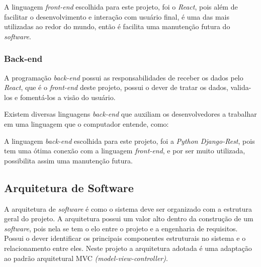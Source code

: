 
A linguagem \textit{front-end} escolhida para este projeto, foi o \textit{React}, pois além de facilitar o desenvolvimento e interação com usuário final, é uma das mais utilizadas ao redor do mundo, então é facilita uma manutenção futura do \textit{software}.

\subsubsection{Back-end}

A programação \textit{back-end} possui as responsabilidades de receber os dados pelo \textit{React}, que é o \textit{front-end} deste projeto, possui o dever de tratar os dados, valida-los e fomentá-los a visão do usuário.

Existem diversas linguagens \textit{back-end} que auxiliam os desenvolvedores a trabalhar em uma linguagem que o computador entende, como:


A linguagem \textit{back-end} escolhida para este projeto, foi a \textit{Python Django-Rest}, pois tem uma ótima conexão com a linguagem \textit{front-end}, e por ser muito utilizada, possibilita assim uma manutenção futura.

\subsection{Arquitetura de Software}

A arquitetura de \textit{software} é como o sistema deve ser organizado com a estrutura geral do projeto. A arquitetura possui um valor alto dentro da construção de um \textit{software}, pois nela se tem o elo entre o projeto e a engenharia de requisitos. Possui o dever identificar os principais componentes estruturais no sistema e o relacionamento entre eles. Neste projeto a arquitetura adotada é uma adaptação ao padrão arquitetural MVC \textit{(model-view-controller)}.

